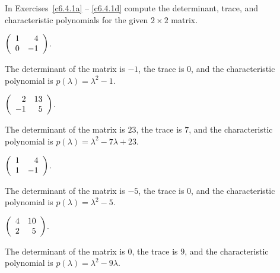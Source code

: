 \documentclass{ximera}
\begin{document}
\noindent In Exercises~\ref{c6.4.1a} -- \ref{c6.4.1d} compute the
determinant, trace, and characteristic polynomials for the given 
$2\times 2$ matrix.

\begin{exercise} \label{c6.4.1a}
$\left(\begin{array}{rr} 1 & 4\\ 0 &-1\end{array}\right)$.

\begin{solution}
\ans The determinant of the matrix is $-1$, the trace is $0$, and
the characteristic polynomial is $p(\lambda)=\lambda^2-1$.

\end{solution}
\end{exercise}

\begin{exercise} \label{c6.4.1b}
$\left(\begin{array}{rr} 2 & 13\\ -1 &5\end{array}\right)$.

\begin{solution}
\ans
The determinant of the matrix is $23$, the trace is $7$, and
the characteristic polynomial is $p(\lambda)=\lambda^2-7\lambda+23$.

\end{solution}
\end{exercise}

\begin{exercise} \label{c6.4.1c}
$\left(\begin{array}{rr} 1 & 4\\ 1 &-1\end{array}\right)$.

\begin{solution}
\ans
The determinant of the matrix is $-5$, the trace is $0$, and
the characteristic polynomial is $p(\lambda)=\lambda^2-5$.

\end{solution}
\end{exercise}

\begin{exercise} \label{c6.4.1d}
$\left(\begin{array}{rr} 4 & 10\\ 2 &5\end{array}\right)$.

\begin{solution}
\ans The determinant of the matrix is $0$, the trace is $9$, and
the characteristic polynomial is $p(\lambda)=\lambda^2-9\lambda$.

\end{solution}
\end{exercise}
\end{document}
